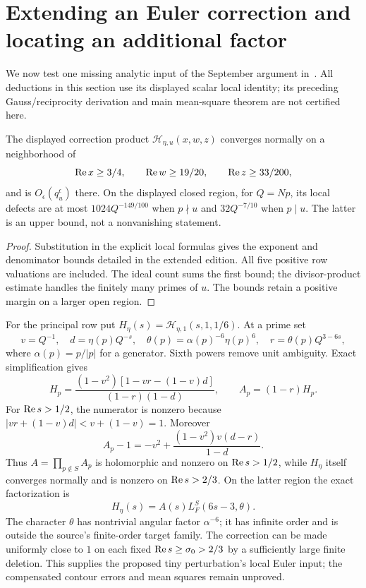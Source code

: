 \section{Extending an Euler correction and locating an additional factor}
We now test one missing analytic input of the September argument
in~\cite{mathsource}. All deductions in this section use its displayed
scalar local identity; its preceding Gauss/reciprocity derivation and
main mean-square theorem are not certified here.
\begin{proposition}
The displayed correction product $\mathcal H_{\eta,u}(x,w,z)$ converges
normally on a neighborhood of
\[
 \operatorname{Re} x\ge3/4,\qquad \operatorname{Re} w\ge19/20,\qquad \operatorname{Re} z\ge33/200,
\]
and is $O_\epsilon(q_u^\epsilon)$ there. On the displayed closed region,
for $Q=Np$, its local defects
are at most $1024Q^{-149/100}$ when $p\nmid u$ and
$32Q^{-7/10}$ when $p\mid u$. The latter is an upper bound,
not a nonvanishing statement.
\end{proposition}
\begin{proof}
Substitution in the explicit local formulas gives the exponent and
denominator bounds detailed in the extended edition. All five positive
row valuations are included. The ideal count sums the first bound;
the divisor-product estimate handles the finitely many primes of $u$.
The bounds retain a positive margin on a larger open region.
\end{proof}

For the principal row put $H_\eta(s)=\mathcal H_{\eta,1}(s,1,1/6)$.
At a prime set
\[
 v=Q^{-1},\quad d=\eta(p)Q^{-s},\quad
 \theta(p)=\alpha(p)^{-6}\eta(p)^6,\quad r=\theta(p)Q^{3-6s},
\]
where $\alpha(p)=p/|p|$ for a generator. Sixth powers remove unit
ambiguity. Exact simplification gives
\[
 H_p=\frac{(1-v^2)[1-vr-(1-v)d]}{(1-r)(1-d)},\qquad A_p=(1-r)H_p.
\]
For $\operatorname{Re} s>1/2$, the numerator is nonzero because
$|vr+(1-v)d|<v+(1-v)=1$. Moreover
\[
 A_p-1=-v^2+\frac{(1-v^2)v(d-r)}{1-d}.
\]
Thus $A=\prod_{p\notin S}A_p$ is holomorphic and nonzero on
$\operatorname{Re} s>1/2$, while $H_\eta$ itself converges normally and is nonzero
on $\operatorname{Re} s>2/3$. On the latter region the exact factorization is
\[
 H_\eta(s)=A(s)L_F^S(6s-3,\theta).
\]
The character $\theta$ has nontrivial angular factor $\alpha^{-6}$;
it has infinite order and is outside the source's finite-order target family.
The correction can be made uniformly close to $1$ on each fixed
$\operatorname{Re} s\ge\sigma_0>2/3$ by a sufficiently large finite deletion.
This supplies the proposed tiny perturbation's local Euler input;
the compensated contour errors and mean squares remain unproved.

